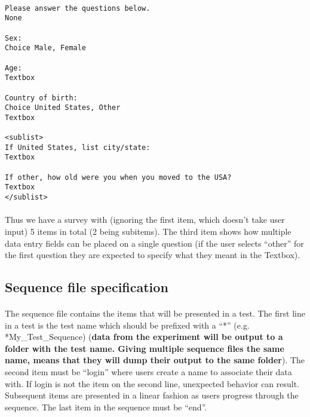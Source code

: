 \paragraph{}

\begin{tcolorbox}[colback=white,colframe=blue,width=\dimexpr\textwidth+12mm\relax,enlarge left by=-6mm,enlarge right by=6mm]

\begin{lstlisting}
Please answer the questions below.
None

Sex: 
Choice Male, Female

Age:
Textbox

Country of birth:
Choice United States, Other
Textbox

<sublist>
If United States, list city/state:
Textbox

If other, how old were you when you moved to the USA?
Textbox
</sublist>

\end{lstlisting}

\end{tcolorbox}

\paragraph{}
Thus we have a survey with (ignoring the first item, which doesn't take user input) 5 items in total (2 being subitems).  The third item shows how multiple data entry fields can be placed on a single question (if the user selects ``other'' for the first question they are expected to specify what they meant in the Textbox).


\subsection{Sequence file specification}
\label{sec:sequenceSpec}

\paragraph{}
The sequence file contains the items that will be presented in a test.  The first line in a test is the test name which should be prefixed with a ``*'' (e.g. *My\_Test\_Sequence) (\textbf{data from the experiment will be output to a folder with the test name.  Giving multiple sequence files the same name, means that they will dump their output to the same folder}).  The second item must be ``login'' where users create a name to associate their data with.  If login is not the item on the second line, unexpected behavior can result.
Subsequent items are presented in a linear fashion as users progress through the sequence.  The last item in the sequence must be ``end''.

